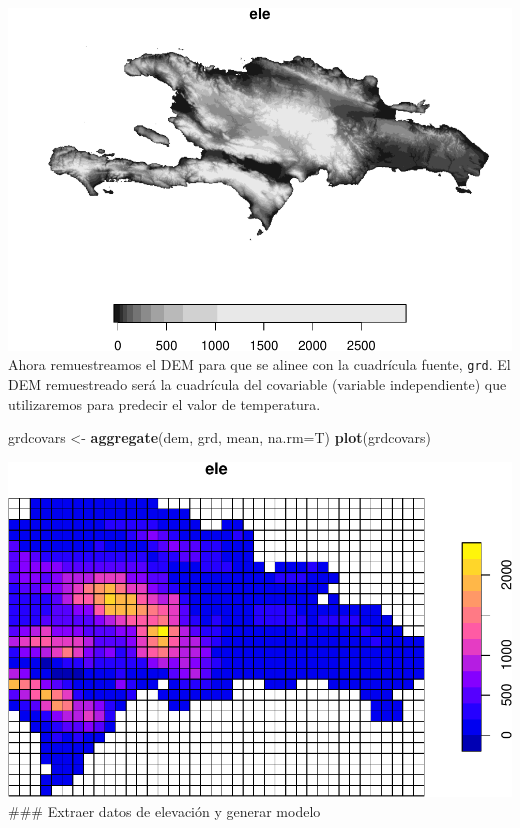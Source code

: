 \documentclass[11pt,]{article}
\newenvironment{Shaded}{\begin{snugshade}}{\end{snugshade}}
\newcommand{\KeywordTok}[1]{\textcolor[rgb]{0.13,0.29,0.53}{\textbf{#1}}}
\newcommand{\DataTypeTok}[1]{\textcolor[rgb]{0.13,0.29,0.53}{#1}}
\newcommand{\StringTok}[1]{\textcolor[rgb]{0.31,0.60,0.02}{#1}}
\newcommand{\NormalTok}[1]{#1}
\begin{document}
\includegraphics[width=800px]{proyecto_files/figure-latex/dem-1} Ahora
remuestreamos el DEM para que se alinee con la cuadrícula fuente,
\texttt{grd}. El DEM remuestreado será la cuadrícula del covariable
(variable independiente) que utilizaremos para predecir el valor de
temperatura.

\begin{Shaded}
\begin{Highlighting}[]
\NormalTok{grdcovars <-}\StringTok{ }\KeywordTok{aggregate}\NormalTok{(dem, grd, mean, }\DataTypeTok{na.rm=}\NormalTok{T)}
\KeywordTok{plot}\NormalTok{(grdcovars)}
\end{Highlighting}
\end{Shaded}

\includegraphics[width=800px]{proyecto_files/figure-latex/remuestrear-dem-1}
\#\#\# Extraer datos de elevación y generar modelo
\end{document}
